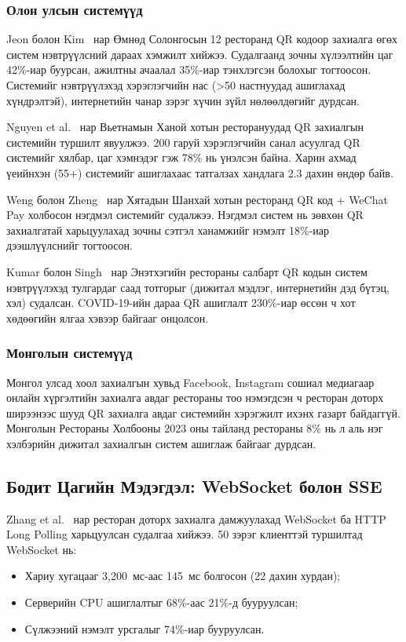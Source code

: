 \documentclass[12pt,a4paper]{article}
\begin{document}
\subsubsection{Олон улсын системүүд}

Jeon болон Kim~\cite{jeon2020} нар Өмнөд Солонгосын 12 ресторанд
QR кодоор захиалга өгөх систем нэвтрүүлсний дараах хэмжилт хийжээ.
Судалгаанд зочны хүлээлтийн цаг 42\%-иар буурсан, ажилтны ачаалал
35\%-иар тэнхлэгсэн болохыг тогтоосон. Системийг нэвтрүүлэхэд
хэрэглэгчийн нас (>50 настнуудад ашиглахад хүндрэлтэй), интернетийн
чанар зэрэг хүчин зүйл нөлөөлдөгийг дурдсан.

Nguyen et al.~\cite{nguyen2021} нар Вьетнамын Ханой хотын ресторануудад
QR захиалгын системийн туршилт явуулжээ. 200 гаруй хэрэглэгчийн
санал асуулгад QR системийг хялбар, цаг хэмнэдэг гэж 78\% нь
үнэлсэн байна. Харин ахмад үеийнхэн (55+) системийг ашиглахаас
татгалзах хандлага 2.3 дахин өндөр байв.

Weng болон Zheng~\cite{weng2022} нар Хятадын Шанхай хотын ресторанд
QR код + WeChat Pay холбосон нэгдмэл системийг судалжээ. Нэгдмэл
систем нь зөвхөн QR захиалгатай харьцуулахад зочны сэтгэл ханамжийг
нэмэлт 18\%-иар дээшлүүлснийг тогтоосон.

Kumar болон Singh~\cite{kumar2020} нар Энэтхэгийн рестораны салбарт
QR кодын систем нэвтрүүлэхэд тулгардаг саад тотгорыг (дижитал
мэдлэг, интернетийн дэд бүтэц, хэл) судалсан. COVID-19-ийн дараа
QR ашиглалт 230\%-иар өссөн ч хот хөдөөгийн ялгаа хэвээр байгааг
онцолсон.

\subsubsection{Монголын системүүд}

Монгол улсад хоол захиалгын хувьд Facebook, Instagram сошиал
медиагаар онлайн хүргэлтийн захиалга авдаг рестораны тоо нэмэгдсэн
ч ресторан доторх ширээнээс шууд QR захиалга авдаг системийн
хэрэгжилт ихэнх газарт байдаггүй. Монголын Рестораны Холбооны
2023 оны тайланд \cite{mrhba2023} рестораны 8\% нь л аль нэг
хэлбэрийн дижитал захиалгын систем ашиглаж байгааг дурдсан.

\subsection{Бодит Цагийн Мэдэгдэл: WebSocket болон SSE}

Zhang et al.~\cite{zhang2021} нар ресторан доторх захиалга дамжуулахад
WebSocket ба HTTP Long Polling харьцуулсан судалгаа хийжээ. 50 зэрэг
клиенттэй туршилтад WebSocket нь:
\begin{itemize}
  \item Хариу хугацааг 3,200~мс-аас 145~мс болгосон (22 дахин хурдан);
  \item Серверийн CPU ашиглалтыг 68\%-аас 21\%-д бууруулсан;
  \item Сүлжээний нэмэлт урсгалыг 74\%-иар бууруулсан.
\end{itemize}
\end{document}
